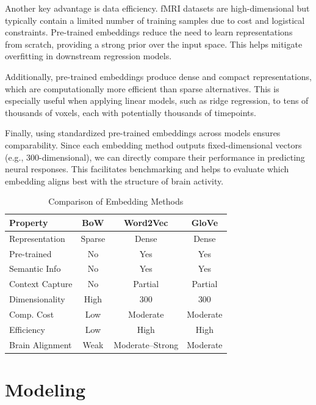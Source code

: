 \documentclass[11pt,letterpaper]{article}
\begin{document}
Another key advantage is data efficiency. fMRI datasets are high-dimensional but typically contain a limited number of training samples due to cost and logistical constraints. Pre-trained embeddings reduce the need to learn representations from scratch, providing a strong prior over the input space. This helps mitigate overfitting in downstream regression models.

Additionally, pre-trained embeddings produce dense and compact representations, which are computationally more efficient than sparse alternatives. This is especially useful when applying linear models, such as ridge regression, to tens of thousands of voxels, each with potentially thousands of timepoints.

Finally, using standardized pre-trained embeddings across models ensures comparability. Since each embedding method outputs fixed-dimensional vectors (e.g., 300-dimensional), we can directly compare their performance in predicting neural responses. This facilitates benchmarking and helps to evaluate which embedding aligns best with the structure of brain activity.

\begin{table}[htbp]
\centering
\small
\caption{Comparison of Embedding Methods}
\begin{tabular}{l|c|c|c}
\toprule
\textbf{Property} & \textbf{BoW} & \textbf{Word2Vec} & \textbf{GloVe} \\
\midrule
Representation & Sparse & Dense & Dense \\
Pre-trained & No & Yes & Yes \\
Semantic Info & No & Yes & Yes \\
Context Capture & No & Partial & Partial \\
Dimensionality & High & 300 & 300 \\
Comp. Cost & Low & Moderate & Moderate \\
Efficiency & Low & High & High \\
Brain Alignment & Weak & Moderate--Strong & Moderate \\
\bottomrule
\end{tabular}
\end{table}


\newpage
\vspace{1em} %
\section{Modeling}
\vspace{0.5em} %
\end{document}
